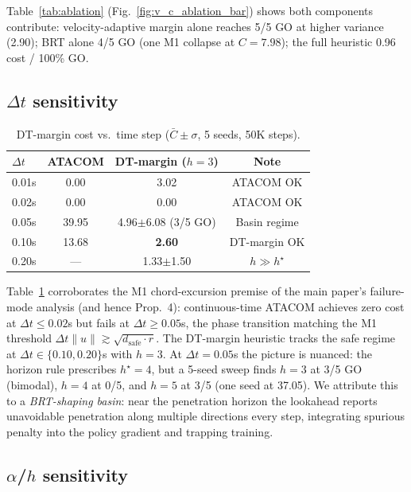 \documentclass[letterpaper]{article}
\begin{document}
Table~\ref{tab:ablation} (Fig.~\ref{fig:v_c_ablation_bar}) shows both components contribute: velocity-adaptive margin alone reaches 5/5 GO at higher variance (2.90); BRT alone 4/5 GO (one M1 collapse at $C{=}7.98$); the full heuristic 0.96 cost / 100\% GO.

\subsection{$\Delta t$ sensitivity}
\label{sec:dt-sweep}

\begin{table}[t]
\centering
\caption{DT-margin cost vs.\ time step ($\bar C \pm \sigma$, 5 seeds, 50K steps).}
\label{tab:dt}
\setlength{\tabcolsep}{4pt}
\begin{tabular}{lccc}
\toprule
$\Delta t$ & ATACOM & DT-margin ($h{=}3$) & Note \\
\midrule
0.01s  & 0.00  & 3.02 & ATACOM OK \\
0.02s  & 0.00  & 0.00 & ATACOM OK \\
0.05s  & 39.95 & 4.96$\pm$6.08 (3/5 GO) & Basin regime \\
0.10s  & 13.68 & \textbf{2.60} & DT-margin OK \\
0.20s  &  ---  & 1.33$\pm$1.50 & $h\!\gg\!h^\star$ \\
\bottomrule
\end{tabular}
\end{table}

Table~\ref{tab:dt} corroborates the M1 chord-excursion premise of the main paper's failure-mode analysis (and hence Prop.~4): continuous-time ATACOM achieves zero cost at $\Delta t \le 0.02$s but fails at $\Delta t \ge 0.05$s, the phase transition matching the M1 threshold $\Delta t\|u\| \gtrsim \sqrt{d_\text{safe}\cdot r}$. The DT-margin heuristic tracks the safe regime at $\Delta t \in \{0.10, 0.20\}$s with $h{=}3$. At $\Delta t{=}0.05$s the picture is nuanced: the horizon rule prescribes $h^\star{=}4$, but a 5-seed sweep finds $h{=}3$ at 3/5 GO (bimodal), $h{=}4$ at 0/5, and $h{=}5$ at 3/5 (one seed at 37.05). We attribute this to a \emph{BRT-shaping basin}: near the penetration horizon the lookahead reports unavoidable penetration along multiple directions every step, integrating spurious penalty into the policy gradient and trapping training.

\subsection{$\alpha$/$h$ sensitivity}
\label{sec:alpha-h-sweep}
\end{document}
